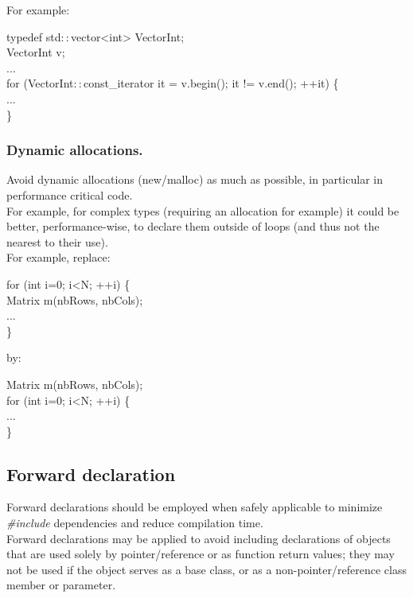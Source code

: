 For example:
\begin{algorithm}[H]
typedef std$::$vector<int> VectorInt; \\
VectorInt v; \\
... \\
for (VectorInt$::$const\_iterator it = v.begin(); it != v.end(); ++it) \{ \\
... \\
\}
\end{algorithm}

\subsubsection{Dynamic allocations.}
Avoid dynamic allocations (new/malloc) as much as possible, in
particular in performance critical code.\\
For example, for complex types (requiring an allocation for example)
it could be better, performance-wise, to declare them outside of loops
(and thus not the nearest to their use).\\

For example, replace:
\begin{algorithm}[H]
for (int i=0; i<N; ++i) \{ \\
Matrix m(nbRows, nbCols); \\
... \\
\}
\end{algorithm}

by:
\begin{algorithm}[H]
Matrix m(nbRows, nbCols); \\
for (int i=0; i<N; ++i) \{ \\
... \\
\}
\end{algorithm}

\subsection{Forward declaration}
Forward declarations should be employed when safely applicable to
minimize \emph{\#include} dependencies and reduce compilation time.\\
Forward declarations may be applied to avoid including declarations of
objects that are used solely by pointer/reference or as function
return values; they may not be used if the object serves as a base
class, or as a non-pointer/reference class member or parameter.\\

